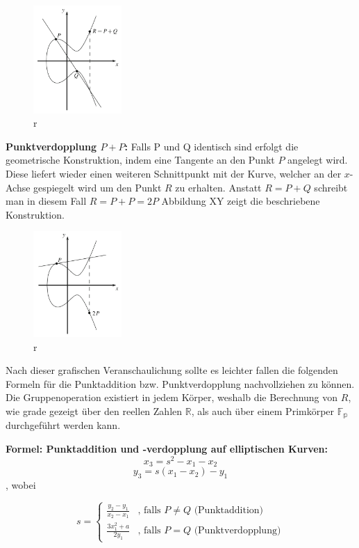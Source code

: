 \begin{figure}[H]
    \centering
    \includegraphics[width=0.3\textwidth]{grafiken/Punktaddition.PNG}
    \caption[Punktaddition]{r}
    \label{fig:Punktaddition}
\end{figure}

\textbf{Punktverdopplung $P + P$:}
Falls P und Q identisch sind erfolgt die geometrische Konstruktion, indem eine Tangente an den Punkt $P$ angelegt wird. Diese liefert wieder einen weiteren Schnittpunkt mit der Kurve, welcher an der $x$-Achse gespiegelt wird um den Punkt $R$ zu erhalten. Anstatt $R = P + Q$ schreibt man in diesem Fall $R = P + P = 2P$   Abbildung XY zeigt die beschriebene Konstruktion. 

\begin{figure}[H]
    \centering
    \includegraphics[width=0.3\textwidth]{grafiken/Punktverdopplung.PNG}
    \caption[Punktverdopplung]{r}
    \label{fig:Punktverdopplung}
\end{figure}

Nach dieser grafischen Veranschaulichung sollte es leichter fallen die folgenden Formeln für die Punktaddition bzw. Punktverdopplung nachvollziehen zu können. Die Gruppenoperation existiert in jedem Körper, weshalb die Berechnung von $R$, wie grade gezeigt über den reellen Zahlen $\mathbb{R}$, als auch über einem Primkörper $\mathbb{F_p}$ durchgeführt werden kann.

\textbf{Formel: Punktaddition und -verdopplung auf elliptischen Kurven:}
$$x_3 = s^2 - x_1 - x_2$$
$$y_3 = s(x_1 - x_2) - y_1$$,
wobei

$$s = \begin{cases}
	\frac{y_2 - y_1}{x_2 -x_1} & \text{, falls } P \neq Q \text{ (Punktaddition)}\\
	\frac{3x_1^2 + a}{2y_1} & \text{, falls } P = Q \text{ (Punktverdopplung)}
	\end{cases}
$$
 



























